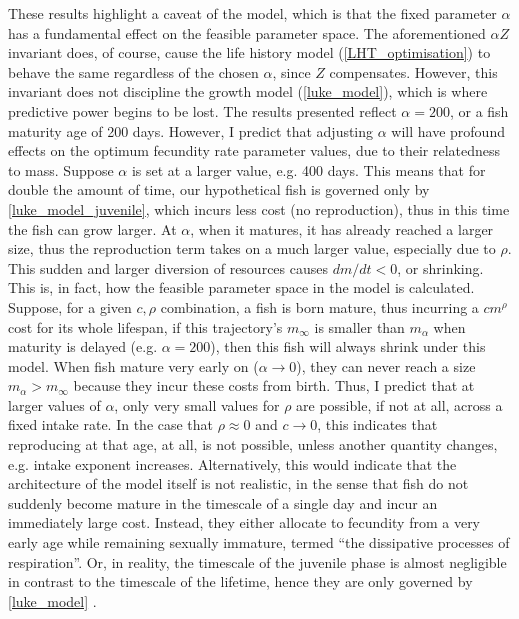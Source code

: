 \documentclass[a4paper]{article} %
\begin{document}
These results highlight a caveat of the model, which is that the fixed parameter $\alpha$ has a fundamental effect on the feasible parameter space. The aforementioned $\alpha Z$ invariant does, of course, cause the life history model (\cref{LHT_optimisation}) to behave the same regardless of the chosen $\alpha$, since $Z$ compensates. However, this invariant does not discipline the growth model (\cref{luke_model}), which is where predictive power begins to be lost. The results presented reflect $\alpha = 200$, or a fish maturity age of 200 days. However, I predict that adjusting $\alpha$ will have profound effects on the optimum fecundity rate parameter values, due to their relatedness to mass. Suppose $\alpha$ is set at a larger value, e.g. 400 days. This means that for double the amount of time, our hypothetical fish is governed only by \cref{luke_model_juvenile}, which incurs less cost (no reproduction), thus in this time the fish can grow larger. At $\alpha$, when it matures, it has already reached a larger size, thus the reproduction term takes on a much larger value, especially due to $\rho$. This sudden and larger diversion of resources causes $dm/dt < 0$, or shrinking. This is, in fact, how the feasible parameter space in the model is calculated. Suppose, for a given $c, \rho$ combination, a fish is born mature, thus incurring a $cm^{\rho}$ cost for its whole lifespan, if this trajectory's $m_{\infty}$ is smaller than $m_{\alpha}$ when maturity is delayed (e.g. $\alpha = 200$), then this fish will always shrink under this model. When fish mature very early on ($\alpha \rightarrow 0$), they can never reach a size $m_{\alpha} > m_{\infty}$ because they incur these costs from birth. Thus, I predict that at larger values of $\alpha$, only very small values for $\rho$ are possible, if not at all, across a fixed intake rate. In the case that $\rho \approx 0$ and $c \rightarrow 0$, this indicates that reproducing at that age, at all, is not possible, unless another quantity changes, e.g. intake exponent increases. Alternatively, this would indicate that the architecture of the model itself is not realistic, in the sense that fish do not suddenly become mature in the timescale of a single day and incur an immediately large cost. Instead, they either allocate to fecundity from a very early age while remaining sexually immature, termed ``the dissipative processes of respiration''. Or, in reality, the timescale of the juvenile phase is almost negligible in contrast to the timescale of the lifetime, hence they are only governed by \cref{luke_model} \autocite{West2001}. 
\end{document}
